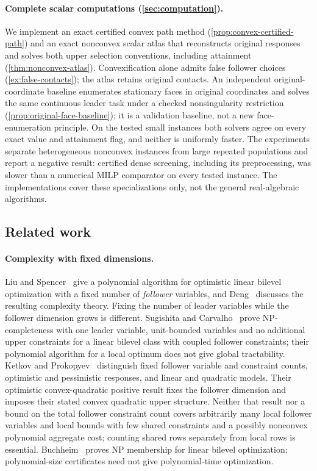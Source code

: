 \paragraph{Complete scalar computations (\cref{sec:computation}).}
We implement an exact certified convex path method
(\cref{prop:convex-certified-path}) and an exact nonconvex scalar atlas
that reconstructs original responses and solves both upper selection
conventions, including attainment (\cref{thm:nonconvex-atlas}).
Convexification alone admits false follower choices
(\cref{ex:false-contacts}); the atlas retains original contacts. An
independent original-coordinate baseline enumerates stationary faces in original coordinates
and solves the same continuous leader task under a checked nonsingularity
restriction (\cref{prop:original-face-baseline}); it is a validation
baseline, not a new face-enumeration principle. On the tested small
instances both solvers agree on every exact value and attainment flag, and
neither is uniformly faster. The experiments separate heterogeneous
nonconvex instances from large repeated populations and report a negative
result: certified dense screening, including its preprocessing, was slower
than a numerical MILP comparator on every tested instance. The
implementations cover these specializations only, not the general
real-algebraic algorithms.

\subsection{Related work}\label{subsec:related}

\paragraph{Complexity with fixed dimensions.}
Liu and Spencer~\cite{LiuSpencer1995} give a polynomial algorithm for
optimistic linear bilevel optimization with a fixed number of
\emph{follower} variables, and Deng~\cite{Deng1998} discusses the resulting
complexity theory. Fixing the number of leader variables while the follower
dimension grows is different. Sugishita and
Carvalho~\cite{SugishitaCarvalhoIPCO2026,SugishitaCarvalho2026} prove
NP-completeness with one leader variable, unit-bounded variables and no
additional upper constraints for a linear bilevel class with coupled
follower constraints; their polynomial algorithm for a local optimum does
not give global tractability. Ketkov and Prokopyev~\cite{KetkovProkopyev2026}
distinguish fixed follower variable and constraint counts, optimistic and
pessimistic responses, and linear and quadratic models. Their optimistic
convex-quadratic positive result fixes the follower dimension and imposes
their stated convex quadratic upper structure. Neither that result nor a
bound on the total follower constraint count covers arbitrarily many local
follower variables and local bounds with few shared constraints and a
possibly nonconvex polynomial aggregate cost; counting shared rows
separately from local rows is essential. Buchheim~\cite{Buchheim2023} proves
NP membership for linear bilevel optimization; polynomial-size certificates
need not give polynomial-time optimization.

